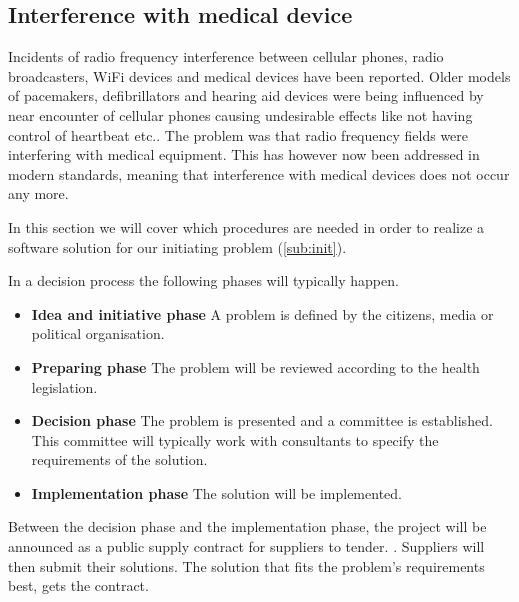 \subsection{Interference with medical device}

Incidents of radio frequency interference between cellular phones, radio broadcasters, WiFi devices and medical devices have been reported. Older models of pacemakers, defibrillators and hearing aid devices were being influenced by near encounter of cellular phones causing undesirable effects like not having control of heartbeat etc.. The problem was that radio frequency fields were interfering with medical equipment. This has however now been addressed in modern standards, meaning that interference with medical devices does not occur any more. \cite{Man1998,Case}


In this section we will cover which procedures are needed in order to realize a software solution for our initiating problem (\cref{sub:init}).

In a decision process the following phases will typically happen. \cite{Sjaelland}

\begin{itemize}
  \setlength{\itemsep}{1pt}
  \setlength{\parskip}{0pt}
  \setlength{\parsep}{0pt}
	\item \textbf{Idea and initiative phase} A problem is defined by the citizens, media or political organisation.
	\item \textbf{Preparing phase} The problem will be reviewed according to the health legislation.
	\item \textbf{Decision phase} The problem is presented and a committee is established. This committee will typically work with consultants to specify the requirements of the solution.
	\item \textbf{Implementation phase} The solution will be implemented. 
\end{itemize}


Between the decision phase and the implementation phase, the project will be announced as a public supply contract for suppliers to tender. \cite{Union2004}. Suppliers will then submit their solutions. The solution that fits the problem's requirements best, gets the contract. 

